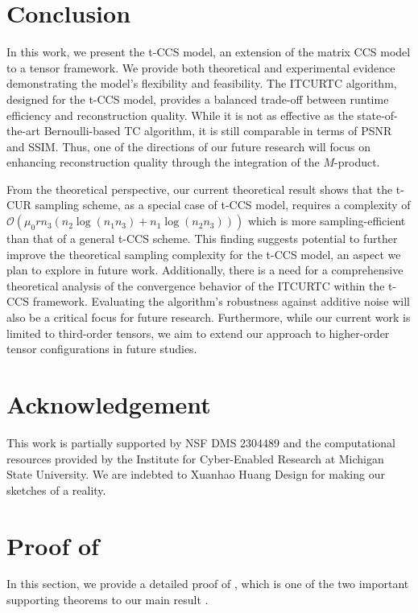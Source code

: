 \documentclass[twoside,12pt]{article}
\begin{document}
\section{Conclusion}
In this work, we present the t-CCS model, an extension of the matrix CCS model to a tensor framework. We provide both theoretical and experimental evidence demonstrating the model's  flexibility and feasibility. The ITCURTC algorithm, designed for the t-CCS model, provides a balanced trade-off between runtime efficiency and reconstruction quality. While it is not as effective as the state-of-the-art Bernoulli-based TC algorithm, it is still comparable in terms of PSNR and SSIM.  Thus, one of the directions of our future research will focus on enhancing reconstruction quality through the integration of the $M$-product. 

From the theoretical perspective, our current theoretical result shows that the t-CUR sampling scheme, as a special case of t-CCS model,  requires a complexity of $\mathcal{O}(\mu_{0}rn_{3}(n_{2}\log(n_{1}n_{3})+n_{1}\log(n_{2}n_{3})))$ which is more sampling-efficient than that of a general t-CCS scheme. This finding suggests potential to further improve the theoretical sampling complexity for the t-CCS model, an aspect we plan to explore in future work. Additionally, there is a need for a comprehensive theoretical analysis of the convergence behavior of the ITCURTC  within the t-CCS framework. Evaluating the algorithm’s robustness against additive noise will also be a critical focus for future research. Furthermore, while our current work is limited to third-order tensors, we aim to extend our approach to higher-order tensor configurations in future studies.
\vspace{-4mm}
 \section*{Acknowledgement}
 This work is partially supported by NSF DMS 2304489 and the computational resources provided by the Institute for Cyber-Enabled Research at Michigan State University. We are indebted to Xuanhao Huang Design for making our sketches of  a reality.
\appendix

\section{Proof of }
In this section, we provide a detailed proof of , which is one of the two important supporting theorems to our main result . 
\end{document}
